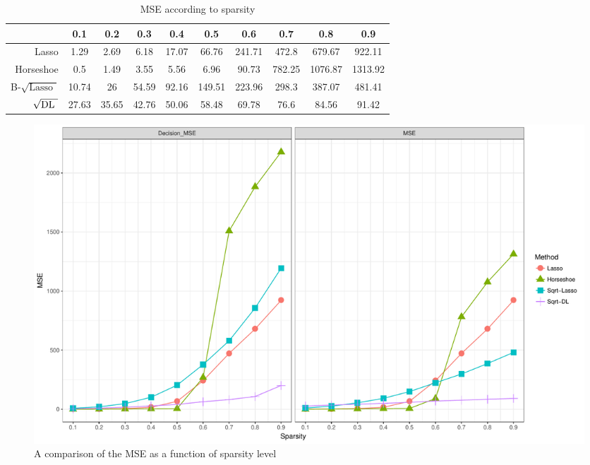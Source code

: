 \documentclass[chapters]{uamaththesis}
\def\sql{$\sqrt{\text{Lasso }}$}
\def\sqdl{$\sqrt{\text{\rm{DL} }}$}
\begin{document}
\begin{table}[h!]
\caption{MSE according to sparsity}\label{MSE}
\begin{center}
\begin{tabular}{c|c|c|c|c|c|c|c|c|c|}
\cline{2-10}
    & 0.1  &  0.2  &  0.3  &  0.4  &  0.5 &   0.6  &  0.7  &  0.8 &   0.9 	\\
\hline
\multicolumn{1}{|r|}{Lasso} & 1.29 &  2.69 &  6.18 &  17.07 & 66.76 &  241.71 & 472.8 &  679.67 &  922.11	\\
\hline
\multicolumn{1}{|r|}{Horseshoe} &   0.5 &   1.49 &  3.55 &  5.56 &  6.96 &   90.73 &  782.25 & 1076.87 & 1313.92 \\
\hline
\multicolumn{1}{|r|}{B-\sql} & 10.74 & 26 &    54.59 & 92.16 & 149.51 & 223.96 & 298.3 &  387.07 &  481.41 \\
\hline
\multicolumn{1}{|r|}{\sqdl} & 27.63 & 35.65 & 42.76 & 50.06 & 58.48 &  69.78 &  76.6 &   84.56 &   91.42 \\
\hline
\end{tabular}
\end{center}

\end{table}


\begin{figure}[h!]
  \centering
  \includegraphics[angle = 90, origin = c ,width=\linewidth , height = .78\textheight ]{Sparsity_MSE_high_n=p}\caption{A comparison of the MSE as a function of sparsity level}
\label{fig:test}
\end{figure}
\end{document}
